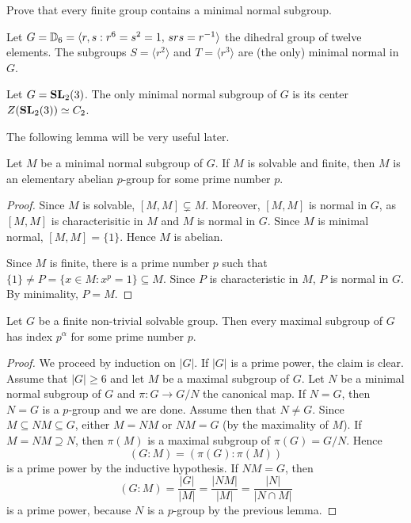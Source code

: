 \begin{exercise}
Prove that every finite group contains a minimal normal subgroup. 
\end{exercise}

\begin{example}
    Let $G=\mathbb{D}_{6}=\langle r,s:r^6=s^2=1,\,srs=r^{-1}\rangle$ the dihedral group of twelve elements. The subgroups
    $S=\langle r^2\rangle$ 
    and $T=\langle r^3\rangle$ are (the only) minimal normal in $G$.
\end{example}

\begin{example}
    Let $G=\mathbf{SL}_2(3)$. The only minimal normal subgroup of $G$ is its center
    $Z(\mathbf{SL}_2(3))\simeq C_2$.
\end{example}


The following lemma will be very useful later. 

\begin{lemma}
\label{lem:minimal_normal}
Let $M$ be a minimal normal subgroup of $G$. If $M$ is solvable and finite, 
then $M$ is an elementary abelian $p$-group for some prime number $p$. 
\end{lemma}

\begin{proof}
Since $M$ is solvable, $[M,M]\subsetneq M$. Moreover, $[M,M]$ is normal in $G$, as
$[M,M]$ is characterisitic in $M$ and $M$ is normal in $G$. Since $M$ is minimal normal, 
$[M,M]=\{1\}$. Hence $M$ is abelian. 
	
Since $M$ is finite, there is a prime number $p$ such that $\{1\}\ne P=\{x\in
M:x^p=1\}\subseteq M$.  Since $P$ is characteristic in $M$, $P$ is normal in 
$G$. By minimality, $P=M$.
\end{proof}

\begin{theorem}
	Let $G$ be a finite non-trivial solvable group. Then 
		every maximal subgroup of $G$ has index $p^\alpha$ for some prime number $p$. 
\end{theorem}

\begin{proof}
	We proceed by induction on $|G|$.
	If $|G|$ is a prime power, the claim is clear. Assume that $|G|\geq6$ and let $M$ be a maximal subgroup of $G$. 
        Let $N$ be a minimal normal subgroup of $G$ and $\pi\colon G\to G/N$ the canonical map. 
	If $N=G$, then $N=G$ is a $p$-group and we are done. Assume then that 
	$N\ne G$. Since $M\subseteq NM\subseteq G$,
	either $M=NM$ or $NM=G$ (by the maximality of $M$).  If 
	$M=NM\supseteq N$, then $\pi(M)$ is a maximal subgroup of $\pi(G)=G/N$. Hence 
	\[
	(G:M)=(\pi(G):\pi(M))
	\]
	is a prime power by the inductive hypothesis. If 
	$NM=G$, then 
	\[
	(G:M)=\frac{|G|}{|M|}=\frac{|NM|}{|M|}=\frac{|N|}{|N\cap M|}
	\]
	is a prime power, because $N$ is a $p$-group by the previous lemma. 
\end{proof}

